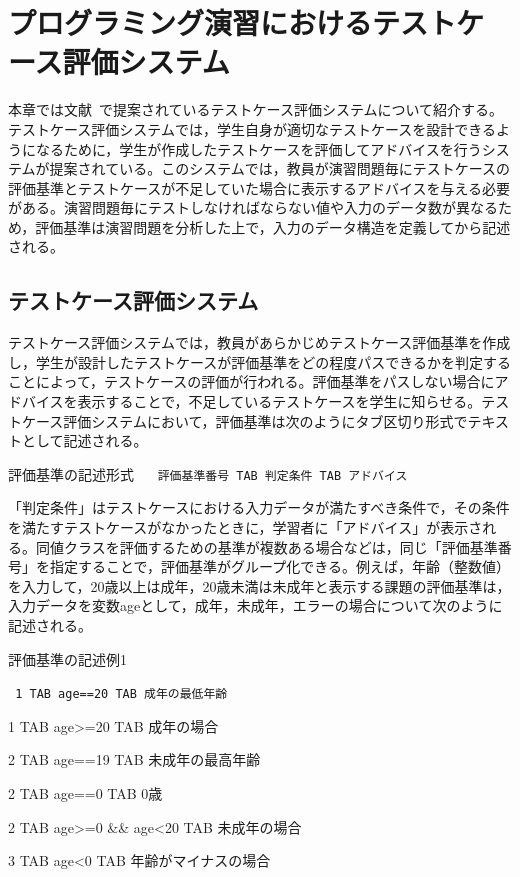 \documentclass{tpu-sotu}
\begin{document}
\chapter{プログラミング演習におけるテストケース評価システム}
本章では文献~\cite{a1}で提案されているテストケース評価システムについて紹介する。テストケース評価システムでは，学生自身が適切なテストケースを設計できるようになるために，学生が作成したテストケースを評価してアドバイスを行うシステムが提案されている。このシステムでは，教員が演習問題毎にテストケースの評価基準とテストケースが不足していた場合に表示するアドバイスを与える必要がある。演習問題毎にテストしなければならない値や入力のデータ数が異なるため，評価基準は演習問題を分析した上で，入力のデータ構造を定義してから記述される。
\section{テストケース評価システム}
テストケース評価システムでは，教員があらかじめテストケース評価基準を作成し，学生が設計したテストケースが評価基準をどの程度パスできるかを判定することによって，テストケースの評価が行われる。評価基準をパスしない場合にアドバイスを表示することで，不足しているテストケースを学生に知らせる。テストケース評価システムにおいて，評価基準は次のようにタブ区切り形式でテキストとして記述される。\\
\begin{minipage}[b]{\textwidth}
\begin{itembox}[l]{評価基準の記述形式}
{\tt
　評価基準番号 TAB 判定条件 TAB アドバイス
}
\end{itembox}
\end{minipage}

「判定条件」はテストケースにおける入力データが満たすべき条件で，その条件を満たすテストケースがなかったときに，学習者に「アドバイス」が表示される。同値クラスを評価するための基準が複数ある場合などは，同じ「評価基準番号」を指定することで，評価基準がグループ化できる。例えば，年齢（整数値）を入力して，20歳以上は成年，20歳未満は未成年と表示する課題の評価基準は，入力データを変数ageとして，成年，未成年，エラーの場合について次のように記述される。\\
\begin{minipage}[b]{\textwidth}
\begin{itembox}[l]{評価基準の記述例1}
{\tt
1 TAB age==20 TAB 成年の最低年齢

1 TAB age>=20 TAB 成年の場合

2 TAB age==19 TAB 未成年の最高年齢

2 TAB age==0 TAB 0歳

2 TAB age>=0 \&\& age<20 TAB 未成年の場合

3 TAB age<0 TAB 年齢がマイナスの場合
}
\end{itembox}
\end{minipage}
\end{document}
